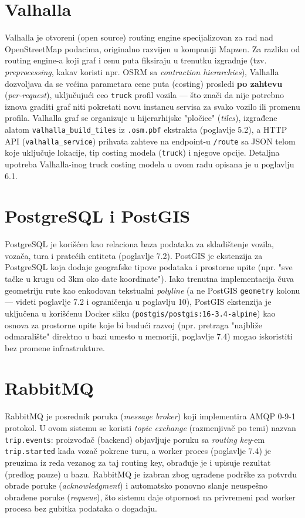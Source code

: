 \section{Valhalla}

Valhalla \cite{valhalla} je otvoreni (open source) routing engine specijalizovan za rad nad OpenStreetMap podacima, originalno razvijen u kompaniji Mapzen. Za razliku od routing engine-a koji graf i cenu puta fiksiraju u trenutku izgradnje (tzv. \emph{preprocessing}, kakav koristi npr. OSRM sa \emph{contraction hierarchies}), Valhalla dozvoljava da se većina parametara cene puta (costing) prosledi \textbf{po zahtevu} (\emph{per-request}), uključujući ceo \texttt{truck} profil vozila — što znači da nije potrebno iznova graditi graf niti pokretati novu instancu servisa za svako vozilo ili promenu profila. Valhalla graf se organizuje u hijerarhijske "pločice" (\emph{tiles}), izgrađene alatom \texttt{valhalla\_build\_tiles} iz \texttt{.osm.pbf} ekstrakta (poglavlje 5.2), a HTTP API (\texttt{valhalla\_service}) prihvata zahteve na endpoint-u \texttt{/route} sa JSON telom koje uključuje lokacije, tip costing modela (\texttt{truck}) i njegove opcije. Detaljna upotreba Valhalla-inog truck costing modela u ovom radu opisana je u poglavlju 6.1.

\section{PostgreSQL i PostGIS}

PostgreSQL je korišćen kao relaciona baza podataka za skladištenje vozila, vozača, tura i pratećih entiteta (poglavlje 7.2). PostGIS \cite{postgis} je ekstenzija za PostgreSQL koja dodaje geografske tipove podataka i prostorne upite (npr. "sve tačke u krugu od 3km oko date koordinate"). Iako trenutna implementacija čuva geometriju rute kao enkodovan tekstualni \emph{polyline} (a ne PostGIS \texttt{geometry} kolonu — videti poglavlje 7.2 i ograničenja u poglavlju 10), PostGIS ekstenzija je uključena u korišćenu Docker sliku (\texttt{postgis/postgis:16-3.4-alpine}) kao osnova za prostorne upite koje bi budući razvoj (npr. pretraga "najbliže odmaralište" direktno u bazi umesto u memoriji, poglavlje 7.4) mogao iskoristiti bez promene infrastrukture.

\section{RabbitMQ}

RabbitMQ \cite{rabbitmq} je posrednik poruka (\emph{message broker}) koji implementira AMQP 0-9-1 protokol. U ovom sistemu se koristi \emph{topic exchange} (razmenjivač po temi) nazvan \texttt{trip.events}: proizvođač (backend) objavljuje poruku sa \emph{routing key}-em \texttt{trip.started} kada vozač pokrene turu, a worker proces (poglavlje 7.4) je preuzima iz reda vezanog za taj routing key, obrađuje je i upisuje rezultat (predlog pauze) u bazu. RabbitMQ je izabran zbog ugrađene podrške za potvrdu obrade poruke (\emph{acknowledgment}) i automatsko ponovno slanje neuspešno obrađene poruke (\emph{requeue}), što sistemu daje otpornost na privremeni pad worker procesa bez gubitka podataka o događaju.

